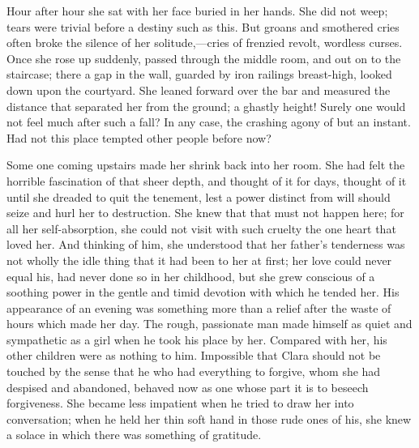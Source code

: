 Hour after hour she sat with her face buried in her hands. She did not
weep; tears were {}trivial before a destiny such as this. But groans and
smothered cries often broke the silence of her solitude,---cries of
frenzied revolt, wordless curses. Once she rose up suddenly, passed
through the middle room, and out on to the staircase; there a gap in the
wall, guarded by iron railings breast-high, looked down upon the
courtyard. She leaned forward over the bar and measured the distance
that separated her from the ground; a ghastly height! Surely one would
not feel much after such a fall? In any case, the crashing agony of but
an instant. Had not this place tempted other people before now?

Some one coming upstairs made her shrink back into her room. She had
felt the horrible fascination of that sheer depth, and thought of it for
days, thought of it until she dreaded to quit the tenement, lest a power
distinct from will should seize and hurl her to destruction. She knew
that that must not happen here; for all her self-absorption, she could
not visit with such cruelty the one heart that loved her. And thinking
of him, she understood that her father's tenderness was not wholly the
idle thing that it had been to her at first; her love could never
{}equal his, had never done so in her childhood, but she grew conscious
of a soothing power in the gentle and timid devotion with which he
tended her. His appearance of an evening was something more than a
relief after the waste of hours which made her day. The rough,
passionate man made himself as quiet and sympathetic as a girl when he
took his place by her. Compared with her, his other children were as
nothing to him. Impossible that Clara should not be touched by the sense
that he who had everything to forgive, whom she had despised and
abandoned, behaved now as one whose part it is to beseech forgiveness.
She became less impatient when he tried to draw her into conversation;
when he held her thin soft hand in those rude ones of his, she knew a
solace in which there was something of gratitude.

